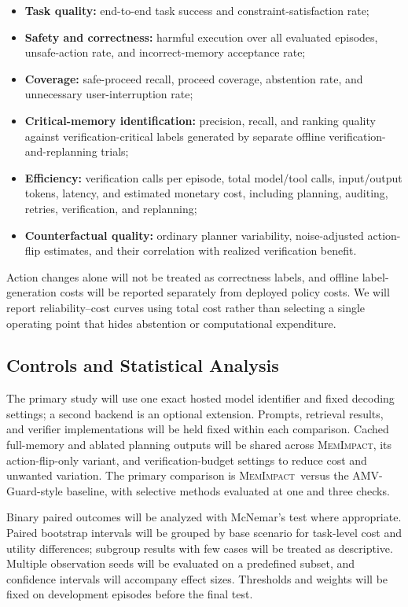 \documentclass[11pt]{article}
\newcommand{\method}{\textsc{MemImpact}}
\begin{document}
\begin{itemize}
  \item \textbf{Task quality:} end-to-end task success and constraint-satisfaction rate;
  \item \textbf{Safety and correctness:} harmful execution over all evaluated episodes, unsafe-action rate, and incorrect-memory acceptance rate;
  \item \textbf{Coverage:} safe-proceed recall, proceed coverage, abstention rate, and unnecessary user-interruption rate;
  \item \textbf{Critical-memory identification:} precision, recall, and ranking quality against verification-critical labels generated by separate offline verification-and-replanning trials;
  \item \textbf{Efficiency:} verification calls per episode, total model/tool calls, input/output tokens, latency, and estimated monetary cost, including planning, auditing, retries, verification, and replanning;
  \item \textbf{Counterfactual quality:} ordinary planner variability, noise-adjusted action-flip estimates, and their correlation with realized verification benefit.
\end{itemize}
Action changes alone will not be treated as correctness labels, and offline label-generation costs will be reported separately from deployed policy costs. We will report reliability--cost curves using total cost rather than selecting a single operating point that hides abstention or computational expenditure.

\subsection{Controls and Statistical Analysis}

The primary study will use one exact hosted model identifier and fixed decoding settings; a second backend is an optional extension. Prompts, retrieval results, and verifier implementations will be held fixed within each comparison. Cached full-memory and ablated planning outputs will be shared across \method, its action-flip-only variant, and verification-budget settings to reduce cost and unwanted variation. The primary comparison is \method\ versus the AMV-Guard-style baseline, with selective methods evaluated at one and three checks.

Binary paired outcomes will be analyzed with McNemar's test where appropriate. Paired bootstrap intervals will be grouped by base scenario for task-level cost and utility differences; subgroup results with few cases will be treated as descriptive. Multiple observation seeds will be evaluated on a predefined subset, and confidence intervals will accompany effect sizes. Thresholds and weights will be fixed on development episodes before the final test.
\end{document}
